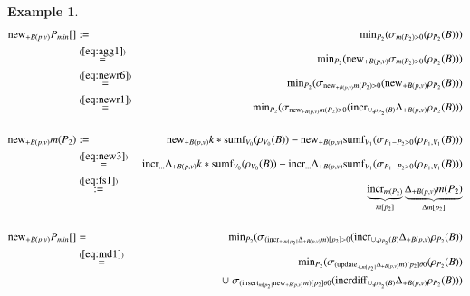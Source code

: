 \documentclass{article}
\newtheorem{example}[theorem]{Example}
\begin{document}
\begin{example}
\begin{eqnarray*}
\algnew_{+B(p,v)} P_{min}[]
&:=&
\algmin_{P_2}(\sigma_{m(P_2) > 0} (\rho_{P_2}(B)))
\\ 
&\stackrel{(\ref{eq:agg1})}{=}&
\algmin_{P_2}(\algnew_{+B(p,v)} \sigma_{m(P_2) > 0} (\rho_{P_2}(B)))
\\
&\stackrel{(\ref{eq:newr6})}{=}&
\algmin_{P_2}(\sigma_{\algnew_{+B(p,v)} m(P_2) > 0} (
\algnew_{+B(p,v)} \rho_{P_2}(B)))
\\
&\stackrel{(\ref{eq:newr1})}{=}&
\algmin_{P_2}(
\sigma_{\algnew_{+B(p,v)} m(P_2) > 0} 
(\algincr_{\cup, \rho_{P_2}(B)} \Delta_{+B(p,v)} \rho_{P_2}(B)))
%
%
%
\\[3ex]
\algnew_{+B(p,v)} m(P_2)
&:=&
\algnew_{+B(p,v)} k* \algsumf_{V_0}(\rho_{V_0}(B))
-
\algnew_{+B(p,v)} \algsumf_{V_1}(\sigma_{P_1 - P_2 > 0}(\rho_{P_1,V_1}(B)))
\\
&\stackrel{(\ref{eq:new3})}{=}&
\algincr_{\dots} \Delta_{+B(p,v)} k* \algsumf_{V_0}(\rho_{V_0}(B))
-
\algincr_{\dots} \Delta_{+B(p,v)}
\algsumf_{V_1}(\sigma_{P_1 - P_2 > 0}(\rho_{P_1,V_1}(B)))
\\
&\stackrel{(\ref{eq:fs1})}{:=}&
\underbrace{\algincr_{m(P_2)}}_{m[p_2]}
\underbrace{\Delta_{+B(p,v)} m(P_2)}_{\Delta m[p_2]}
\\[3ex]
%
%
%
\algnew_{+B(p,v)} P_{min}[]
&=&
\algmin_{P_2}
(\sigma_{(\algincr_{+, m[p_2]} \Delta_{+B(p,v)} m)[p_2] > 0}
(\algincr_{\cup, \rho_{P_2}(B)} \Delta_{+B(p,v)} \rho_{P_2}(B))
\\
&\stackrel{(\ref{eq:md1})}{=}&
\algmin_{P_2}
(\sigma_{(\algupdate_{+, m[p_2]} \Delta_{+B(p,v)} m)[p_2] \theta 0}(\rho_{P_2} (B))
\nonumber \\
&& \cup \;
\sigma_{(\alginsert_{m[p_2]} \algnew_{+B(p,v)} m)[p_2] \theta 0}
(\algincrdiff_{\cup, \rho_{P_2}(B)} \Delta_{+B(p,v)} \rho_{P_2}(B)))
\end{eqnarray*}



\end{example}
\end{document}
